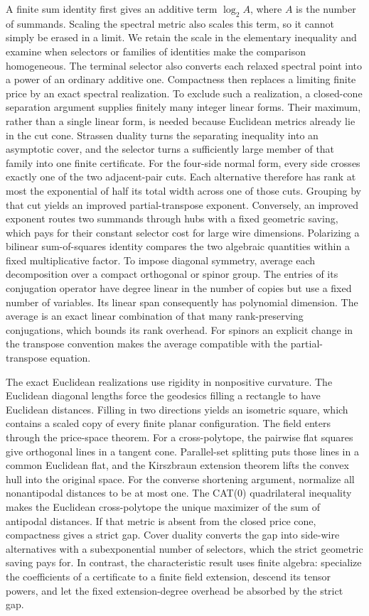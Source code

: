 \documentclass[11pt,a4paper]{article}
\theoremstyle{definition}
\theoremstyle{remark}
\begin{document}
A finite sum identity first gives an additive term $\log_2A$, where
$A$ is the number of summands. Scaling the spectral metric also scales
this term, so it cannot simply be erased in a limit.
We retain the scale in the elementary inequality and examine when
selectors or families of identities make the comparison homogeneous.
The terminal selector also converts each relaxed spectral point
into a power of an ordinary additive one.
Compactness then replaces a limiting finite price by an exact
spectral realization. To exclude such a realization, a closed-cone
separation argument supplies finitely many integer linear forms.
Their maximum, rather than a single linear form, is needed
because Euclidean metrics already lie in the cut cone.
Strassen duality turns the separating inequality into an
asymptotic cover, and the selector turns a sufficiently large
member of that family into one finite certificate.
For the four-side normal form, every side crosses exactly one
of the two adjacent-pair cuts. Each alternative therefore has
rank at most the exponential of half its total width across
one of those cuts. Grouping by that cut yields an improved
partial-transpose exponent. Conversely, an improved exponent
routes two summands through hubs with a fixed geometric saving,
which pays for their constant selector cost for large wire dimensions.
Polarizing a bilinear sum-of-squares identity compares the two
algebraic quantities within a fixed multiplicative factor.
To impose diagonal symmetry, average each decomposition over a
compact orthogonal or spinor group. The entries of its conjugation
operator have degree linear in the number of copies but use a fixed
number of variables. Its linear span consequently has polynomial
dimension. The average is an exact linear combination of that many
rank-preserving conjugations, which bounds its rank overhead.
For spinors an explicit change in the transpose convention makes
the average compatible with the partial-transpose equation.

The exact Euclidean realizations use rigidity in nonpositive curvature.
The Euclidean diagonal lengths force the geodesics filling a rectangle
to have Euclidean distances. Filling in two directions yields an
isometric square, which contains a scaled copy of every finite planar
configuration. The field enters through the price-space theorem.
For a cross-polytope, the pairwise flat squares give orthogonal
lines in a tangent cone. Parallel-set splitting puts those lines
in a common Euclidean flat, and the Kirszbraun extension theorem
lifts the convex hull into the original space.
For the converse shortening argument, normalize all
nonantipodal distances to be at most one. The CAT(0)
quadrilateral inequality makes the Euclidean cross-polytope
the unique maximizer of the sum of antipodal distances.
If that metric is absent from the closed price cone,
compactness gives a strict gap. Cover duality converts the gap
into side-wire alternatives with a subexponential number of
selectors, which the strict geometric saving pays for.
In contrast, the characteristic result uses finite algebra:
specialize the coefficients of a certificate to a finite field
extension, descend its tensor powers, and let the fixed
extension-degree overhead be absorbed by the strict gap.
\end{document}
